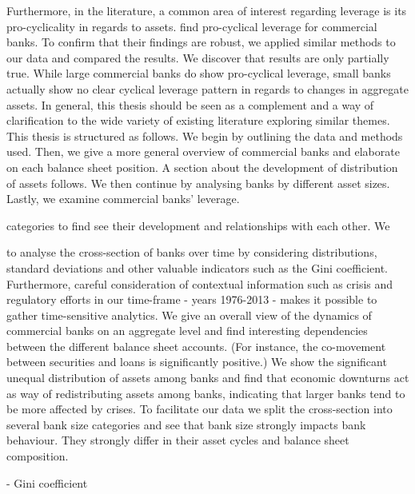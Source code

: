 \documentclass[12pt, a4paper]{article} %
\begin{document}
Furthermore, in the literature, a common area of interest regarding leverage is its pro-cyclicality in regards to assets. \citet{AdrianShin2011} find pro-cyclical leverage for commercial banks. To confirm that their findings are robust, we applied similar methods to our data and compared the results. We discover that \citet{AdrianShin2011} results are only partially true. While large commercial banks do show pro-cyclical leverage, small banks actually show no clear cyclical leverage pattern in regards to changes in aggregate assets.
In general, this thesis should be seen as a complement and a way of clarification to the wide variety of existing literature exploring similar themes. \\
This thesis is structured as follows. We begin by outlining the data and methods used. Then, we give a more general overview of commercial banks and elaborate on each balance sheet position. A section about the development of distribution of assets follows. We then continue by analysing banks by different asset sizes. Lastly, we examine commercial banks' leverage.

\iffalse
 categories to find see their development and relationships with each other. 
We 

to analyse the cross-section of banks over time by considering distributions, standard deviations and other valuable indicators such as the Gini coefficient. Furthermore, careful consideration of contextual information such as crisis and regulatory efforts in our time-frame - years 1976-2013 - makes it possible to gather time-sensitive analytics.
We give an overall view of the dynamics of commercial banks on an aggregate level and find interesting dependencies between the different balance sheet accounts. (For instance, the co-movement between securities and loans is significantly positive.)
We show the significant unequal distribution of assets among banks and find that economic downturns act as way of redistributing assets among banks, indicating that larger banks tend to be more affected by crises.
To facilitate our data we split the cross-section into several bank size categories and see that bank size strongly impacts bank behaviour. They strongly differ in their asset cycles and balance sheet composition.  


- Gini coefficient 
\end{document}
